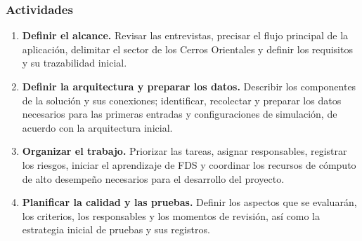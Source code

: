 \subsubsection{Actividades}\label{sec:inicio-actividades}

\begin{enumerate}
    \item \textbf{Definir el alcance.}
    Revisar las entrevistas, precisar el flujo principal de la
    aplicación, delimitar el sector de los Cerros Orientales y
    definir los requisitos y su trazabilidad inicial.

    \item \textbf{Definir la arquitectura y preparar los datos.}
    Describir los componentes de la solución y sus conexiones;
    identificar, recolectar y preparar los datos necesarios para
    las primeras entradas y configuraciones de simulación, de
    acuerdo con la arquitectura inicial.

    \item \textbf{Organizar el trabajo.}
    Priorizar las tareas, asignar responsables, registrar los
    riesgos, iniciar el aprendizaje de FDS y coordinar los
    recursos de cómputo de alto desempeño necesarios para el
    desarrollo del proyecto.

    \item \textbf{Planificar la calidad y las pruebas.}
    Definir los aspectos que se evaluarán, los criterios, los
    responsables y los momentos de revisión, así como la
    estrategia inicial de pruebas y sus registros.
\end{enumerate}